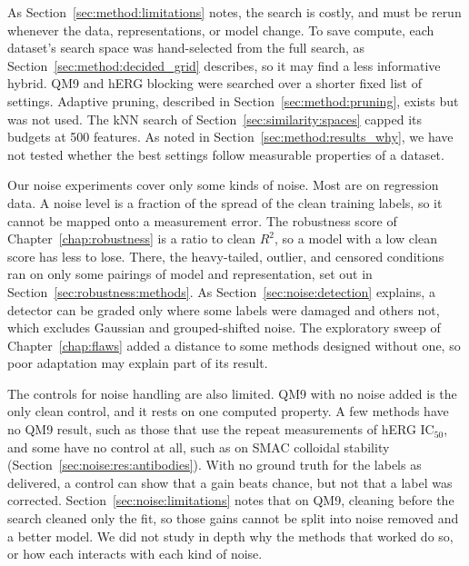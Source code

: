 As Section~\ref{sec:method:limitations} notes, the search is costly, and must be rerun whenever the data, representations, or model change. To save compute, each dataset's search space was hand-selected from the full search, as Section~\ref{sec:method:decided_grid} describes, so it may find a less informative hybrid. QM9 and hERG blocking were searched over a shorter fixed list of settings. Adaptive pruning, described in Section~\ref{sec:method:pruning}, exists but was not used. The kNN search of Section~\ref{sec:similarity:spaces} capped its budgets at 500 features. As noted in Section~\ref{sec:method:results_why}, we have not tested whether the best settings follow measurable properties of a dataset.

Our noise experiments cover only some kinds of noise. Most are on regression data. A noise level is a fraction of the spread of the clean training labels, so it cannot be mapped onto a measurement error. The robustness score \aucnorm{} of Chapter~\ref{chap:robustness} is a ratio to clean $R^2$, so a model with a low clean score has less to lose. There, the heavy-tailed, outlier, and censored conditions ran on only some pairings of model and representation, set out in Section~\ref{sec:robustness:methods}. As Section~\ref{sec:noise:detection} explains, a detector can be graded only where some labels were damaged and others not, which excludes Gaussian and grouped-shifted noise. The exploratory sweep of Chapter~\ref{chap:flaws} added a distance to some methods designed without one, so poor adaptation may explain part of its result.

The controls for noise handling are also limited. QM9 with no noise added is the only clean control, and it rests on one computed property. A few methods have no QM9 result, such as those that use the repeat measurements of hERG IC$_{50}$, and some have no control at all, such as  on SMAC colloidal stability (Section~\ref{sec:noise:res:antibodies}). With no ground truth for the labels as delivered, a control can show that a gain beats chance, but not that a label was corrected. Section~\ref{sec:noise:limitations} notes that on QM9, cleaning before the search cleaned only the fit, so those gains cannot be split into noise removed and a better model. We did not study in depth why the methods that worked do so, or how each interacts with each kind of noise.

